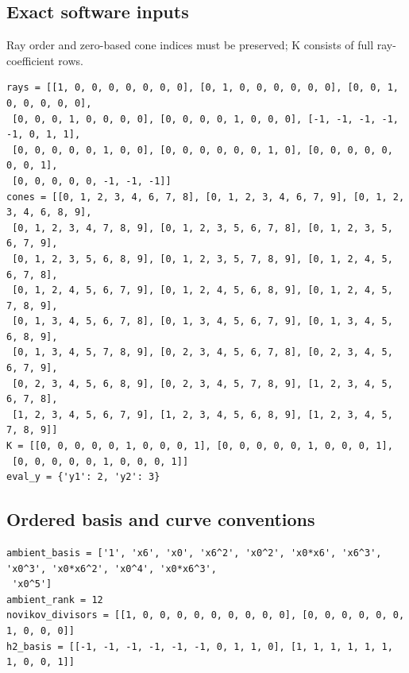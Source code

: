 \documentclass[10pt,a4paper]{article}
\begin{document}
\subsection*{Exact software inputs}
Ray order and zero-based cone indices must be preserved; K consists of full ray-coefficient rows.
\begin{lstlisting}
rays = [[1, 0, 0, 0, 0, 0, 0, 0], [0, 1, 0, 0, 0, 0, 0, 0], [0, 0, 1, 0, 0, 0, 0, 0],
 [0, 0, 0, 1, 0, 0, 0, 0], [0, 0, 0, 0, 1, 0, 0, 0], [-1, -1, -1, -1, -1, 0, 1, 1],
 [0, 0, 0, 0, 0, 1, 0, 0], [0, 0, 0, 0, 0, 0, 1, 0], [0, 0, 0, 0, 0, 0, 0, 1],
 [0, 0, 0, 0, 0, -1, -1, -1]]
cones = [[0, 1, 2, 3, 4, 6, 7, 8], [0, 1, 2, 3, 4, 6, 7, 9], [0, 1, 2, 3, 4, 6, 8, 9],
 [0, 1, 2, 3, 4, 7, 8, 9], [0, 1, 2, 3, 5, 6, 7, 8], [0, 1, 2, 3, 5, 6, 7, 9],
 [0, 1, 2, 3, 5, 6, 8, 9], [0, 1, 2, 3, 5, 7, 8, 9], [0, 1, 2, 4, 5, 6, 7, 8],
 [0, 1, 2, 4, 5, 6, 7, 9], [0, 1, 2, 4, 5, 6, 8, 9], [0, 1, 2, 4, 5, 7, 8, 9],
 [0, 1, 3, 4, 5, 6, 7, 8], [0, 1, 3, 4, 5, 6, 7, 9], [0, 1, 3, 4, 5, 6, 8, 9],
 [0, 1, 3, 4, 5, 7, 8, 9], [0, 2, 3, 4, 5, 6, 7, 8], [0, 2, 3, 4, 5, 6, 7, 9],
 [0, 2, 3, 4, 5, 6, 8, 9], [0, 2, 3, 4, 5, 7, 8, 9], [1, 2, 3, 4, 5, 6, 7, 8],
 [1, 2, 3, 4, 5, 6, 7, 9], [1, 2, 3, 4, 5, 6, 8, 9], [1, 2, 3, 4, 5, 7, 8, 9]]
K = [[0, 0, 0, 0, 0, 1, 0, 0, 0, 1], [0, 0, 0, 0, 0, 1, 0, 0, 0, 1],
 [0, 0, 0, 0, 0, 1, 0, 0, 0, 1]]
eval_y = {'y1': 2, 'y2': 3}
\end{lstlisting}
\subsection*{Ordered basis and curve conventions}
\begin{lstlisting}
ambient_basis = ['1', 'x6', 'x0', 'x6^2', 'x0^2', 'x0*x6', 'x6^3', 'x0^3', 'x0*x6^2', 'x0^4', 'x0*x6^3',
 'x0^5']
ambient_rank = 12
novikov_divisors = [[1, 0, 0, 0, 0, 0, 0, 0, 0, 0], [0, 0, 0, 0, 0, 0, 1, 0, 0, 0]]
h2_basis = [[-1, -1, -1, -1, -1, -1, 0, 1, 1, 0], [1, 1, 1, 1, 1, 1, 1, 0, 0, 1]]
\end{lstlisting}
\end{document}
